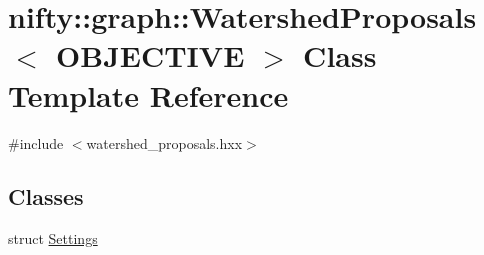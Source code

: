 \hypertarget{classnifty_1_1graph_1_1WatershedProposals}{}\section{nifty\+:\+:graph\+:\+:Watershed\+Proposals$<$ O\+B\+J\+E\+C\+T\+I\+V\+E $>$ Class Template Reference}
\label{classnifty_1_1graph_1_1WatershedProposals}


{\ttfamily \#include $<$watershed\+\_\+proposals.\+hxx$>$}

\subsection*{Classes}
\begin{DoxyCompactItemize}
\item 
struct \hyperlink{structnifty_1_1graph_1_1WatershedProposals_1_1Settings}{Settings}
\end{DoxyCompactItemize}

